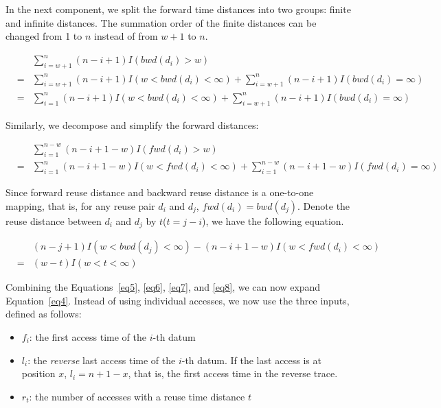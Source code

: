 In the next component, we split the forward time distances into two
groups: finite and infinite distances.  The summation order of the 
finite distances can be changed from 1 to $n$ instead of from $w+1$ to
$n$.

\begin{eqnarray}
\label{eq6}
&\ &\sum_{i=w+1}^{n}(n-i+1)I(bwd(d_i)>w) \\
&=& \sum_{i=w+1}^{n}(n-i+1)I(w<bwd(d_i)<\infty)+\sum_{i=w+1}^{n}(n-i+1)I(bwd(d_i)=\infty)\nonumber\\
&=&
\sum_{i=1}^{n}(n-i+1)I(w<bwd(d_i)<\infty)+\sum_{i=w+1}^{n}(n-i+1)I(bwd(d_i)=\infty)\nonumber
\end{eqnarray}


\noindent Similarly, we decompose and simplify the forward distances:

\begin{eqnarray}
\label{eq7}
&\ &\sum_{i=1}^{n-w}(n-i+1-w)I(fwd(d_i)>w) \\
&=& \sum_{i=1}^{n}(n-i+1-w)I(w<fwd(d_i)<\infty)+\sum_{i=1}^{n-w}(n-i+1-w)I(fwd(d_i)=\infty)\nonumber
\end{eqnarray}

Since forward reuse distance and backward reuse distance is a
one-to-one mapping, that is, for any reuse pair $d_i$ and $d_j$,
$fwd(d_i)=bwd(d_j)$. Denote the reuse distance between $d_i$ and
$d_j$ by $t$($t=j-i$), we have the following equation.

\begin{eqnarray}
\label{eq8}
&\ &(n-j+1)I(w<bwd(d_j)<\infty)-(n-i+1-w)I(w<fwd(d_i)<\infty)\nonumber\\
&=&(w-t)I(w<t<\infty)
\end{eqnarray}

Combining the Equations~\ref{eq5}, \ref{eq6}, \ref{eq7}, and \ref{eq8}, we can now
expand Equation~\ref{eq4}.  Instead of using individual accesses,
we now use the three inputs, 
defined as follows:

\begin{itemize}
\item $f_i$: the first access time of the $i$-th datum
\item $l_i$: the \emph{reverse} last access time of the $i$-th datum.
  If the last access is at position $x$, $l_i = n+1-x$, that is, the
  first access time in the reverse trace.
\item $r_t$: the number of accesses with a reuse time distance $t$
\end{itemize}

